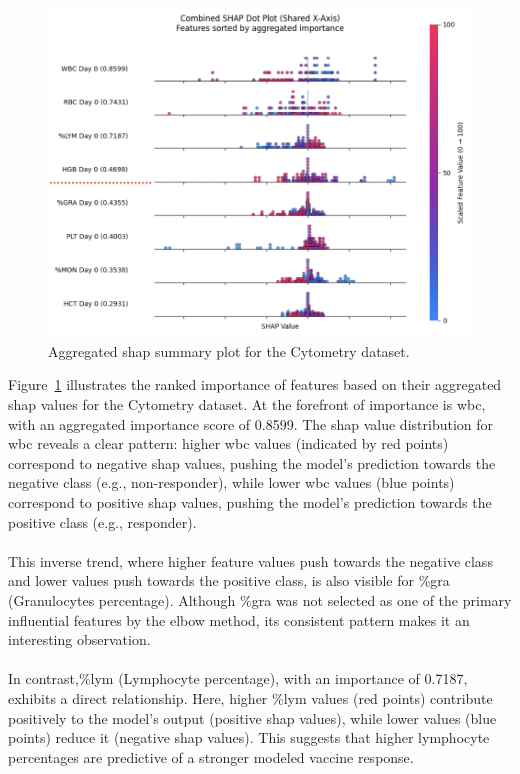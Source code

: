 \documentclass[12pt,a4paper]{report}
\begin{document}
\begin{figure}[h!]
    \centering
    \includegraphics[width=0.9\linewidth]{images/Aggregated_SHAP_cytometry_uncompressed.png}
    \caption[Aggregated SHAP plot for Cytometry]{Aggregated \gls{shap} summary plot for the Cytometry dataset.}
    \label{fig:cytometry_aggregated_shap}
\end{figure}
\noindent
Figure~\ref{fig:cytometry_aggregated_shap} illustrates the ranked importance of features based on their aggregated \gls{shap} values for the Cytometry dataset. At the forefront of importance is \gls{wbc}, with an aggregated importance score of 0.8599. The \gls{shap} value distribution for \gls{wbc} reveals a clear pattern: higher \gls{wbc} values (indicated by red points) correspond to negative \gls{shap} values, pushing the model's prediction towards the negative class (e.g., non-responder), while lower \gls{wbc} values (blue points) correspond to positive \gls{shap} values, pushing the model's prediction towards the positive class (e.g., responder).\\
\\
This inverse trend, where higher feature values push towards the negative class and lower values push towards the positive class, is also visible for \%\acrshort{gra} (Granulocytes percentage). Although \%\acrshort{gra} was not selected as one of the primary influential features by the elbow method, its consistent pattern makes it an interesting observation.\\
\\
In contrast,\%\acrshort{lym} (Lymphocyte percentage), with an importance of 0.7187, exhibits a direct relationship. Here, higher \%\acrshort{lym} values (red points) contribute positively to the model's output (positive \gls{shap} values), while lower values (blue points) reduce it (negative \gls{shap} values). This suggests that higher lymphocyte percentages are predictive of a stronger modeled vaccine response.\\
\end{document}
